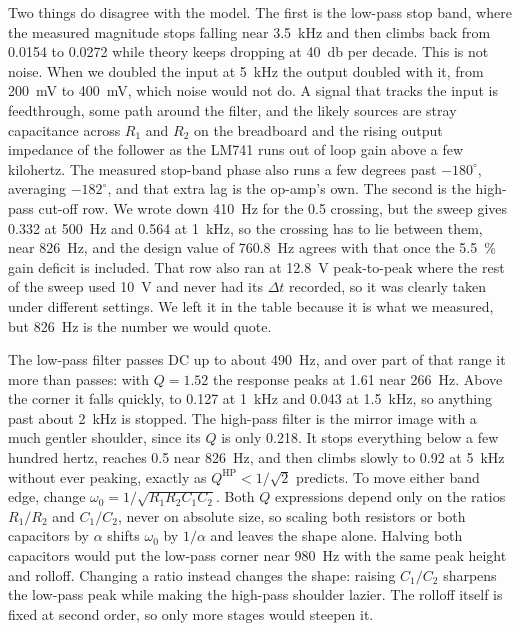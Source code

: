 \documentclass[11pt]{article}
\begin{document}
Two things do disagree with the model. The first is the low-pass stop band, where
the measured magnitude stops falling near \qty{3.5}{\kilo\hertz} and then climbs
back from 0.0154 to 0.0272 while theory keeps dropping at \qty{40}{\decibel} per
decade. This is not noise. When we doubled the input at \qty{5}{\kilo\hertz} the
output doubled with it, from \qty{200}{\milli\volt} to \qty{400}{\milli\volt},
which noise would not do. A signal that tracks the input is feedthrough, some path
around the filter, and the likely sources are stray capacitance across $R_1$ and
$R_2$ on the breadboard and the rising output impedance of the follower as the
LM741 runs out of loop gain above a few kilohertz. The measured stop-band phase
also runs a few degrees past $-180^{\circ}$, averaging $-182^{\circ}$, and that
extra lag is the op-amp's own. The second is the high-pass cut-off row. We wrote
down \qty{410}{\hertz} for the 0.5 crossing, but the sweep gives 0.332 at
\qty{500}{\hertz} and 0.564 at \qty{1}{\kilo\hertz}, so the crossing has to lie
between them, near \qty{826}{\hertz}, and the design value of \qty{760.8}{\hertz}
agrees with that once the \qty{5.5}{\percent} gain deficit is included. That row
also ran at \qty{12.8}{\volt} peak-to-peak where the rest of the sweep used
\qty{10}{\volt} and never had its $\Delta t$ recorded, so it was clearly taken
under different settings. We left it in the table because it is what we measured,
but \qty{826}{\hertz} is the number we would quote.

The low-pass filter passes DC up to about \qty{490}{\hertz}, and over part of that
range it more than passes: with $Q = 1.52$ the response peaks at 1.61 near
\qty{266}{\hertz}. Above the corner it falls quickly, to 0.127 at
\qty{1}{\kilo\hertz} and 0.043 at \qty{1.5}{\kilo\hertz}, so anything past about
\qty{2}{\kilo\hertz} is stopped. The high-pass filter is the mirror image with a
much gentler shoulder, since its $Q$ is only 0.218. It stops everything below a
few hundred hertz, reaches 0.5 near \qty{826}{\hertz}, and then climbs slowly to
0.92 at \qty{5}{\kilo\hertz} without ever peaking, exactly as
$Q^{\text{HP}} < 1/\sqrt{2}$ predicts. To move either band edge, change
$\omega_0 = 1/\sqrt{R_1R_2C_1C_2}$. Both $Q$ expressions depend only on the ratios
$R_1/R_2$ and $C_1/C_2$, never on absolute size, so scaling both resistors or both
capacitors by $\alpha$ shifts $\omega_0$ by $1/\alpha$ and leaves the shape alone.
Halving both capacitors would put the low-pass corner near \qty{980}{\hertz} with
the same peak height and rolloff. Changing a ratio instead changes the shape:
raising $C_1/C_2$ sharpens the low-pass peak while making the high-pass shoulder
lazier. The rolloff itself is fixed at second order, so only more stages would
steepen it.
\end{document}
